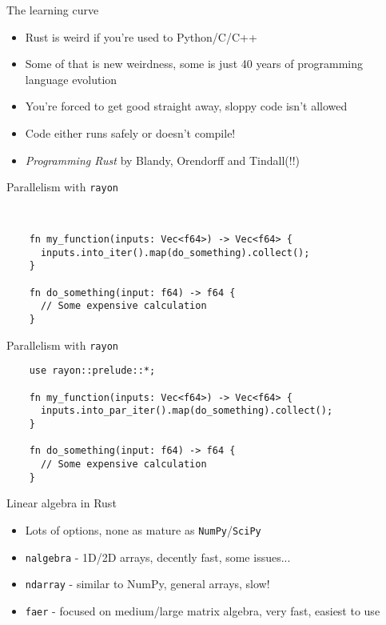 \documentclass{beamer}
\begin{document}
\begin{frame}{The learning curve}
  \begin{itemize}
    \item Rust is weird if you're used to Python/C/C++
    \item Some of that is new weirdness, some is just 40 years of programming language evolution
    \item You're forced to get good straight away, sloppy code isn't allowed
    \item Code either runs safely or doesn't compile!
    \item \textit{Programming Rust} by Blandy, Orendorff and Tindall(!!)
  \end{itemize}
\end{frame}

\begin{frame}[fragile]{Parallelism with \texttt{rayon}}
  \begin{verbatim}


    fn my_function(inputs: Vec<f64>) -> Vec<f64> {
      inputs.into_iter().map(do_something).collect(); 
    }

    fn do_something(input: f64) -> f64 {
      // Some expensive calculation
    }
  \end{verbatim}
\end{frame}

\begin{frame}[fragile]{Parallelism with \texttt{rayon}}
  \begin{verbatim}
    use rayon::prelude::*;

    fn my_function(inputs: Vec<f64>) -> Vec<f64> {
      inputs.into_par_iter().map(do_something).collect(); 
    }

    fn do_something(input: f64) -> f64 {
      // Some expensive calculation
    }
  \end{verbatim}
\end{frame}

\begin{frame}{Linear algebra in Rust}
  \begin{itemize}
    \item Lots of options, none as mature as \texttt{NumPy}/\texttt{SciPy}
    \item \texttt{nalgebra} - 1D/2D arrays, decently fast, some issues... 
    \item \texttt{ndarray} - similar to NumPy, general arrays, slow!
    \item \texttt{faer} - focused on medium/large matrix algebra, very fast, easiest to use
  \end{itemize}
\end{frame}
\end{document}
